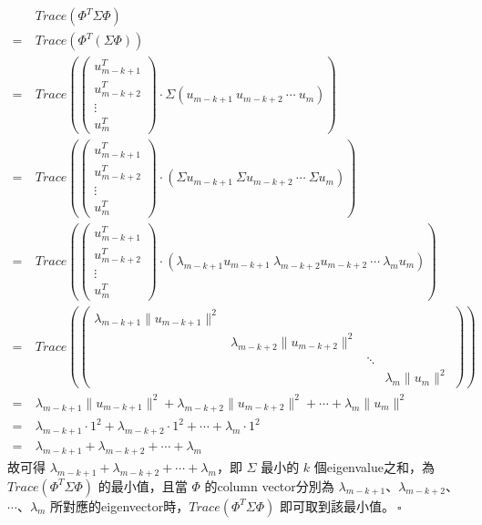 \documentclass{article}
\begin{document}
\begin{align*}
    &Trace(\Phi^T \Sigma \Phi)\\
    =\ &Trace(\Phi^T (\Sigma \Phi))\\
    =\ &Trace \left( \left(
    \begin{array}{c}
        u_{m - k + 1}^T\\
        u_{m - k + 2}^T\\
        \vdots\\
        u_m^T
    \end{array}
    \right) \cdot \Sigma \left( u_{m - k + 1}\ u_{m - k + 2}\ \cdots\ u_m \right) \right)\\
    =\ &Trace \left( \left(
    \begin{array}{c}
        u_{m - k + 1}^T\\
        u_{m - k + 2}^T\\
        \vdots\\
        u_m^T
    \end{array}
    \right) \cdot \left(\Sigma u_{m - k + 1}\ \Sigma u_{m - k + 2}\ \cdots\ \Sigma u_m \right) \right)\\
    =\ &Trace \left( \left(
    \begin{array}{c}
        u_{m - k + 1}^T\\
        u_{m - k + 2}^T\\
        \vdots\\
        u_m^T
    \end{array}
    \right) \cdot \left(\lambda_{m - k + 1} u_{m - k + 1}\ \lambda_{m - k + 2} u_{m - k + 2}\ \cdots\ \lambda_m u_m \right) \right)\\
    =\ &Trace\left( \left(
    \begin{array}{cccc}
        \lambda_{m - k + 1} \| u_{m - k + 1} \|^2 & & &\\
        & \lambda_{m - k + 2} \| u_{m - k + 2} \|^2 & &\\
        & & \ddots &\\
        & & & \lambda_m \| u_m \|^2
    \end{array}
    \right) \right)\\
    =\ &\lambda_{m - k + 1} \| u_{m - k + 1} \|^2 + \lambda_{m - k + 2} \| u_{m - k + 2} \|^2 + \cdots + \lambda_m \| u_m \|^2\\
    =\ &\lambda_{m - k + 1} \cdot 1^2 + \lambda_{m - k + 2} \cdot 1^2 + \cdots + \lambda_m \cdot 1^2\\
    =\ &\lambda_{m - k + 1} + \lambda_{m - k + 2} + \cdots + \lambda_m
\end{align*}
故可得 $\lambda_{m - k + 1} + \lambda_{m - k + 2} + \cdots + \lambda_m$，即 $\Sigma$ 最小的 $k$ 個eigenvalue之和，為 $Trace(\Phi^T \Sigma \Phi)$ 的最小值，且當 $\Phi$ 的column vector分別為 $\lambda_{m - k + 1}$、$\lambda_{m - k + 2}$、$\cdots$、$\lambda_m$ 所對應的eigenvector時，$Trace(\Phi^T \Sigma \Phi)$ 即可取到該最小值。$\ \square$\\
\end{document}
